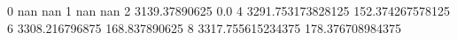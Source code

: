 0 nan nan
1 nan nan
2 3139.37890625 0.0
4 3291.753173828125 152.374267578125
6 3308.216796875 168.837890625
8 3317.755615234375 178.376708984375
